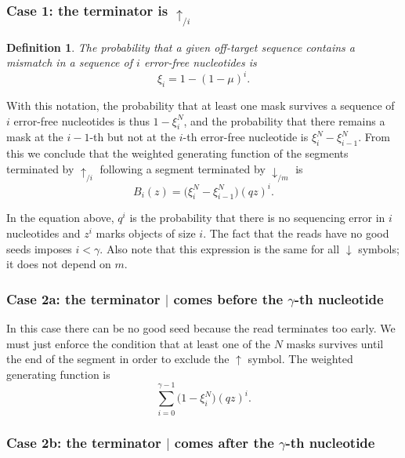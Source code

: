 \documentclass{article}
\newtheorem{definition}{Definition}
\begin{document}
\subsubsection*{Case 1: the terminator is $\uparrow_{/i}$}

\begin{definition}
The probability that a given off-target sequence contains a mismatch in a
sequence of $i$ error-free nucleotides is
\begin{equation}
\label{eq:xi}
\xi_i = 1-(1-\mu)^i.
\end{equation}
\end{definition}

With this notation, the probability that at least one mask survives a
sequence of $i$ error-free nucleotides is thus $1-\xi_i^N$, and the
probability that there remains a mask at the $i-1$-th but not at the 
$i$-th error-free nucleotide is $\xi_i^N - \xi_{i-1}^N$. From this we
conclude that the weighted generating function of the segments terminated
by $\uparrow_{/i}$ following a segment terminated by $\downarrow_{/m}$ is
\begin{equation}
\label{eq:B}
B_i(z) = \Big( \xi_i^N-\xi_{i-1}^N \Big) (qz)^i.
\end{equation}

In the equation above, $q^i$ is the probability that there is no
sequencing error in $i$ nucleotides and $z^i$ marks objects of size $i$.
The fact that the reads have no good seeds imposes $i < \gamma$. Also note
that this expression is the same for all $\downarrow$ symbols; it does not
depend on $m$.

\subsubsection*{Case 2a: the terminator $|$ comes before the $\gamma$-th
nucleotide}

In this case there can be no good seed because the read terminates too
early. We must just enforce the condition that at least one of the $N$
masks survives until the end of the segment in order to exclude the
$\uparrow$ symbol. The weighted generating function is
\begin{equation*}
\sum_{i=0}^{\gamma-1} \Big(1 - \xi_i^N \Big) (qz)^i.
\end{equation*}

\subsubsection*{Case 2b: the terminator $|$ comes after the $\gamma$-th
nucleotide}
\end{document}
